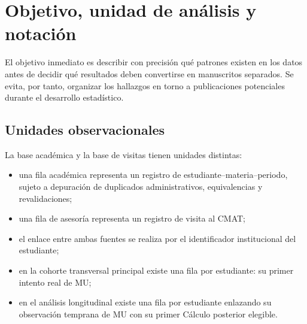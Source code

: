 \documentclass[11pt,letterpaper]{article}
\begin{document}
\begin{abstract}
Finalmente, el análisis longitudinal enlaza al mismo estudiante a través del tiempo. De los 6,627 estudiantes de MU, 4,211 tienen un primer Cálculo posterior con cobertura del CMAT. Este subconjunto se utiliza para estudiar continuidad de uso, pero no sustituye a la cohorte completa de MU para el análisis contemporáneo de desempeño, porque condicionar en haber llegado posteriormente a Cálculo cambia el estimando y selecciona académicamente a los estudiantes. La versión refinada de la transición, documentada en una etapa posterior, conserva 3,241 progresores al siguiente periodo regular y muestra un gradiente pronunciado de uso posterior según el patrón de visitas durante MU. Se proponen como siguientes mejoras obtener el resultado matemático de admisión y una encuesta prospectiva sobre motivos de uso del CMAT.
\end{abstract}

\tableofcontents
\listoffigures
\listoftables
\clearpage
{}

\section{Objetivo, unidad de análisis y notación}

El objetivo inmediato es describir con precisión qué patrones existen en los datos antes de decidir qué resultados deben convertirse en manuscritos separados. Se evita, por tanto, organizar los hallazgos en torno a publicaciones potenciales durante el desarrollo estadístico.

\subsection{Unidades observacionales}

La base académica y la base de visitas tienen unidades distintas:
\begin{itemize}[leftmargin=*]
\item una fila académica representa un registro de estudiante--materia--periodo, sujeto a depuración de duplicados administrativos, equivalencias y revalidaciones;
\item una fila de asesoría representa un registro de visita al CMAT;
\item el enlace entre ambas fuentes se realiza por el identificador institucional del estudiante;
\item en la cohorte transversal principal existe una fila por estudiante: su primer intento real de MU;
\item en el análisis longitudinal existe una fila por estudiante enlazando su observación temprana de MU con su primer Cálculo posterior elegible.
\end{itemize}
\end{document}
